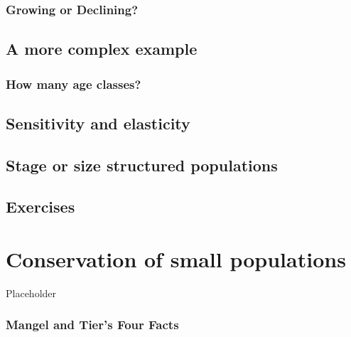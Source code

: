 \documentclass[]{book}
\theoremstyle{definition}
\theoremstyle{definition}
\theoremstyle{definition}
\theoremstyle{remark}
\begin{document}
\hypertarget{growing-or-declining}{%
\subsection*{Growing or Declining?}\label{growing-or-declining}}

\hypertarget{a-more-complex-example}{%
\section{A more complex example}\label{a-more-complex-example}}

\hypertarget{how-many-age-classes}{%
\subsection*{How many age classes?}\label{how-many-age-classes}}

\hypertarget{sensitivity-and-elasticity}{%
\section{Sensitivity and elasticity}\label{sensitivity-and-elasticity}}

\hypertarget{stage-or-size-structured-populations}{%
\section{Stage or size structured
populations}\label{stage-or-size-structured-populations}}

\hypertarget{exercises-4}{%
\section{Exercises}\label{exercises-4}}

\hypertarget{chap:conservation}{%
\chapter{Conservation of small populations}\label{chap:conservation}}

Placeholder

\hypertarget{mangel-and-tiers-four-facts}{%
\subsection*{Mangel and Tier's Four
Facts}\label{mangel-and-tiers-four-facts}}
\end{document}
